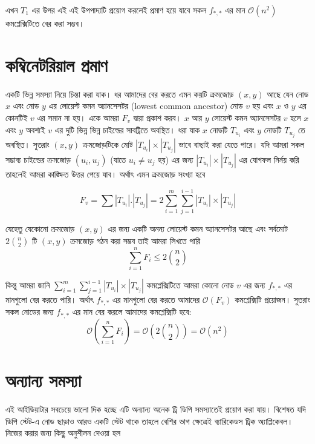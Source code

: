 এখন \(T_{1}\) এর উপর এই এই উপপাদ্যটি প্রয়োগ করলেই প্রমাণ হয়ে যাবে সকল \(f_{*,*}\) এর মান \(\mathcal{O} (n^{2})\) কমপ্লেক্সিটিতে বের করা সম্ভব। 

\section{কম্বিনেটরিয়াল প্রমাণ}
একটি ভিন্ন সমস্যা নিয়ে চিন্তা করা যাক। ধর আমাদের বের করতে এমন কয়টি ক্রমজোড় \((x, y)\) আছে যেন নোড \(x\) এবং নোড \(y\) এর লোয়েস্ট কমন অ্যানসেসটর (lowest common ancestor) নোড \(v\) হয় এবং \(x\) ও \(y\) এর কোনটিই \(v\) এর সমান না হয়। একে আমরা \(F_{v}\) দ্বারা প্রকাশ করব। \(x\) আর \(y\) লোয়েস্ট কমন অ্যানসেসটর \(v\) হলে \(x\) এবং \(y\) অবশ্যই \(v\) এর দুটি ভিন্ন ভিন্ন চাইল্ডের সাবট্রিতে অবস্থিত। ধরা যাক \(x\) নোডটি \(T_{u_{i}}\) এবং \(y\) নোডটি \(T_{u_{j}}\) তে অবস্থিত। সুতরাং \((x, y)\) ক্রমজোড়টিকে মোট \(|T_{u_{i}}| \times |T_{u_{j}}|\) ভাবে বাছাই করা যেতে পারে। যদি আমরা সকল সম্ভাব্য চাইল্ডের ক্রমজোড় \((u_{i}, u_{j})\) (যাতে \(u_{i} \neq u_{j}\) হয়) এর জন্য \(|T_{u_{i}}| \times |T_{u_{j}}|\) এর যোগফল নির্নয় করি তাহলেই আমরা কাঙ্ক্ষিত উত্তর পেয়ে যাব। অর্থাৎ এমন ক্রমজোড় সংখ্যা হবে 

\[F_{v} = \sum |T_{u_{i}}|.|T_{u_{j}}| = 2 \sum_{i = 1}^{m} \sum_{j = 1}^{i - 1} |T_{u_{i}}| \times |T_{u_{j}}|\]

যেহেতু যেকোনো ক্রমজোড় \((x, y)\) এর জন্য একটি অনন্য লোয়েস্ট কমন অ্যানসেসটর আছে এবং সর্বমোট \(2 \binom{n}{2}\) টি \((x, y)\) ক্রমজোড় গঠন করা সম্ভব তাই আমরা লিখতে পারি 
\[\sum_{i = 1}^{n} F_{i} \leq 2 \binom{n}{2}\]

কিন্তু আমরা জানি \(\sum_{i = 1}^{m} \sum_{j = 1}^{i - 1} |T_{u_{i}}| \times |T_{u_{j}}|\) কমপ্লেক্সিটিতে আমরা কোনো নোড \(v\) এর জন্য \(f_{*,*}\) এর মানগুলো বের করতে পারি। অর্থাৎ \(f_{*,*}\) এর মানগুলো বের করতে আমাদের \(\mathcal{O} (F_{v})\) কমপ্লেক্সিটি প্রয়োজন। সুতরাং সকল নোডের জন্য \(f_{*,*}\) এর মান বের করলে আমাদের কমপ্লেক্সিটি হবে: 
\[\mathcal{O} \left ( \sum_{i = 1}^{n} F_{i} \right ) = \mathcal{O} \left ( 2 \binom{n}{2} \right )  =  \mathcal{O} \left ( n^{2} \right )\]

\section{অন্যান্য সমস্যা}
এই আইডিয়াটার সবচেয়ে ভালো দিক হচ্ছে এটি অন্যান্য অনেক ট্রি ডিপি সমস্যাতেই প্রয়োগ করা যায়। বিশেষত যদি ডিপি স্টেট-এ নোড ছাড়াও আরও একটি স্টেট থাকে তাহলে বেশির ভাগ ক্ষেত্রেই ব্যারিকেডস ট্রিক অ্যাপ্লিকেবল। নিজের করার জন্য কিছু অনুশীলন দেওয়া হল 

\begin{diybox}
\end{diybox}
